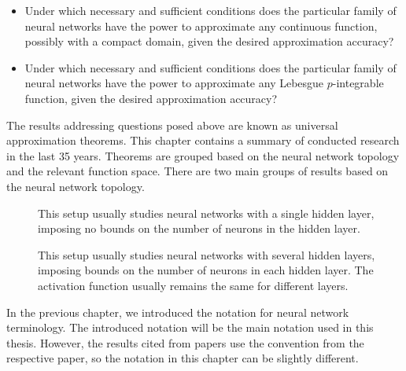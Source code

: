 \begin{itemize}[noitemsep]
    \item Under which necessary and sufficient conditions does the particular family of neural networks have the power to approximate any continuous function, possibly with a compact domain, given the desired approximation accuracy?
    \item Under which necessary and sufficient conditions does the particular family of neural networks have the power to approximate any Lebesgue $p$-integrable function, given the desired approximation accuracy?
\end{itemize}
The results addressing questions posed above are known as universal approximation theorems. This chapter contains a summary of conducted research in the last 35 years. Theorems are grouped based on the neural network topology and the relevant function space.
There are two main groups of results based on the neural network topology.
\begin{description}
\item[]
This setup usually studies neural networks with a single hidden layer, imposing no bounds on the number of neurons in the hidden layer.
\item[]
This setup usually studies neural networks with several hidden layers, imposing bounds on the number of neurons in each hidden layer.
The activation function usually remains the same for different layers.
\end{description}
\begin{remark}
In the previous chapter, we introduced the notation for neural network terminology. The introduced notation will be the main notation used in this thesis. However, the results cited from papers use the convention from the respective paper, so the notation in this chapter can be slightly different.
\end{remark}
